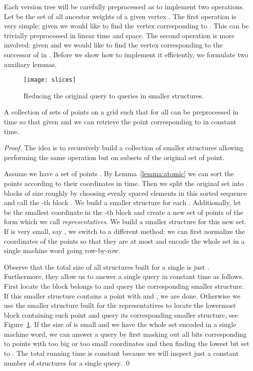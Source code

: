 \documentclass[runningheads]{llncs}
\begin{document}
Each version tree will be carefully preprocessed as to implement two operations. Let  be the set of all ancestor weights of a given vertex . The first operation is very simple: given  we would like to find the vertex corresponding to . This can be trivially preprocessed in linear time and space. The second operation is more involved: given  and  we would like to find the vertex corresponding to the successor of  in . Before we show how to implement it efficiently, we formulate two auxiliary lemmas.

\begin{figure}
\centering
\texttt{[image: slices]}
\caption{Reducing the original query to queries in smaller structures.}
\label{figure:slices}
\end{figure}

\begin{lemma}\label{lemma:small grid}
A collection of sets of points  on a  grid such that  for all  can be preprocessed in  time so that given  and  we can retrieve the point corresponding to  in constant time.
\end{lemma}

\begin{proof}
The idea is to recursively build a collection of smaller structures allowing performing the same operation but on subsets of the original set of point. 

Assume we have a set of  points . By Lemma~\ref{lemma:atomic} we can sort the points according to their  coordinates in  time. Then we split the original set into blocks of size roughly  by choosing  evenly spaced elements  in this sorted sequence and call the -th block . We build a smaller structure for each . Additionally, let  be the smallest  coordinate in the -th block and create a new set of  points of the form  which we call \emph{representatives}. We build a smaller structure for this new set. If  is very small, say , we switch to a different method: we can first normalize the coordinates of the points so that they are at most  and encode the whole set in a single machine word going row-by-row.

Observe that the total size of all structures built for a single  is just . Furthermore, they allow us to answer a single query in constant time as follows. First locate the block  belongs to and query the corresponding smaller structure. If this smaller structure contains a point  with  and , we are done. Otherwise we use the smaller structure built for the representatives to locate the lowermost block containing such point and query its corresponding smaller structure, see Figure~\ref{figure:slices}. If the size of  is small and we have the whole set encoded in a single machine word, we can answer a query by first masking out all bits corresponding to points with too big  or too small  coordinates and then finding the lowest bit set to . The total running time is constant because we will inspect just a constant number of structures for a single query.
\qed
\end{proof}
\end{document}
